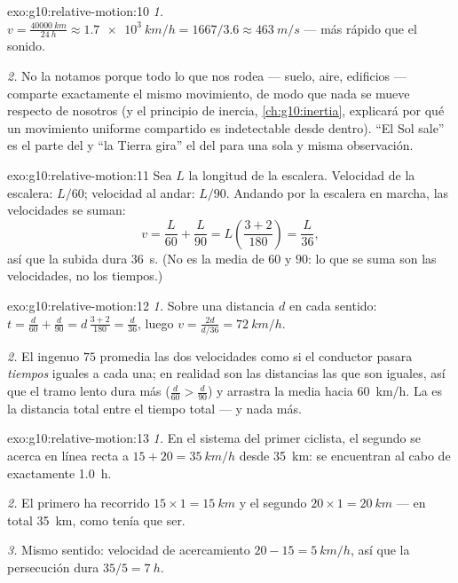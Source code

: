 \begin{solution}{exo:g10:relative-motion:10}
\emph{1.} $v = \frac{\qty{40000}{km}}{\qty{24}{h}}
\approx \qty{1.7e3}{km/h} = 1667/3.6 \approx \qty{463}{m/s}$ --- más
rápido que el sonido.

\emph{2.} No la notamos porque todo lo que nos rodea --- suelo, aire,
edificios --- comparte exactamente el mismo movimiento, de modo que nada
se mueve respecto de nosotros (y el principio de inercia,
\cref{ch:g10:inertia}, explicará por qué un movimiento uniforme
compartido es indetectable desde dentro). ``El Sol sale'' es el parte
del  y ``la Tierra gira'' el del 
para una sola y misma observación.
\end{solution}

\begin{solution}{exo:g10:relative-motion:11}
Sea $L$ la longitud de la escalera. Velocidad de la escalera: $L/60$;
velocidad al andar: $L/90$. Andando por la escalera en marcha, las
velocidades se suman:
\[
v = \frac{L}{60} + \frac{L}{90} = L\left(\frac{3 + 2}{180}\right)
= \frac{L}{36},
\]
así que la subida dura \qty{36}{s}. (No es la media de $60$ y $90$: lo
que se suma son las velocidades, no los tiempos.)
\end{solution}

\begin{solution}{exo:g10:relative-motion:12}
\emph{1.} Sobre una distancia $d$ en cada sentido:
$t = \frac{d}{60} + \frac{d}{90} = d\,\frac{3 + 2}{180} = \frac{d}{36}$,
luego $v = \frac{2d}{d/36} = \qty{72}{km/h}$.

\emph{2.} El ingenuo $75$ promedia las dos velocidades como si el
conductor pasara \emph{tiempos} iguales a cada una; en realidad son las
distancias las que son iguales, así que el tramo lento dura más
($\frac{d}{60} > \frac{d}{90}$) y arrastra la media hacia
\qty{60}{km/h}. La  es la distancia total entre el tiempo
total --- y nada más.
\end{solution}

\begin{solution}{exo:g10:relative-motion:13}
\emph{1.} En el sistema del primer ciclista, el segundo se acerca en
línea recta a $15 + 20 = \qty{35}{km/h}$ desde \qty{35}{km}: se
encuentran al cabo de exactamente \qty{1.0}{h}.

\emph{2.} El primero ha recorrido $15 \times 1 = \qty{15}{km}$ y el
segundo $20 \times 1 = \qty{20}{km}$ --- en total \qty{35}{km}, como
tenía que ser.

\emph{3.} Mismo sentido: velocidad de acercamiento
$20 - 15 = \qty{5}{km/h}$, así que la persecución dura
$35/5 = \qty{7}{h}$.
\end{solution}

